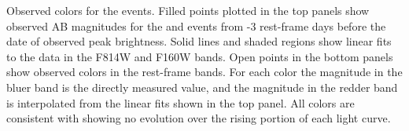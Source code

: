Observed colors for the \spock events.  Filled points plotted in the
top panels show observed AB magnitudes for the \spockone and \spocktwo
events from -3 rest-frame days before the date of observed peak
brightness.  Solid lines and shaded regions show linear fits to the
data in the F814W and F160W bands.  Open points in the bottom panels
show observed colors in the rest-frame bands.  For each color the
magnitude in the bluer band is the directly measured value, and the
magnitude in the redder band is interpolated from the linear fits
shown in the top panel.  All colors are consistent with showing no
evolution over the rising portion of each light curve.
\label{fig:ColorCurves}
